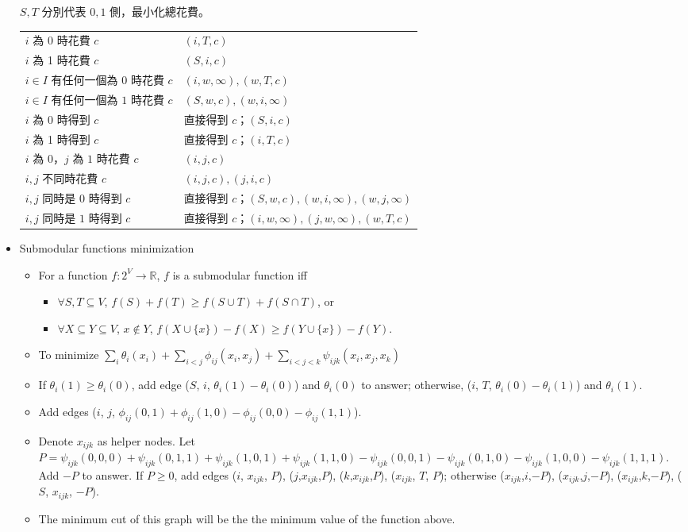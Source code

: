 \begin{itemize}
    $S, T$ 分別代表 $0, 1$ 側，最小化總花費。
    \begin{tabular}{|l|l|}
      $i$ 為 0 時花費 $c$ & $(i, T, c)$ \\
      $i$ 為 1 時花費 $c$ & $(S, i, c)$ \\
      $i \in I$ 有任何一個為 $0$ 時花費 $c$ & $(i, w, \infty), (w, T, c)$ \\
      $i \in I$ 有任何一個為 $1$ 時花費 $c$ & $(S, w, c), (w, i, \infty)$ \\
      $i$ 為 0 時得到 $c$ & 直接得到 $c$；$(S, i, c)$ \\
      $i$ 為 1 時得到 $c$ & 直接得到 $c$；$(i, T, c)$ \\
      $i$ 為 0，$j$ 為 $1$ 時花費 $c$ & $(i, j, c)$ \\
      $i, j$ 不同時花費 $c$ & $(i, j, c), (j, i, c)$ \\
      $i, j$ 同時是 $0$ 時得到 $c$ & 直接得到 $c$；$(S, w, c), (w, i, \infty), (w, j, \infty)$ \\
      $i, j$ 同時是 $1$ 時得到 $c$ & 直接得到 $c$；$(i, w, \infty), (j, w, \infty), (w, T, c)$ \\
    \end{tabular}
  \item Submodular functions minimization
    \begin{itemize}
      \item For a function $f: 2^V \to \mathbb{R}$, $f$ is a submodular function iff
        \begin{itemize}
          \item $\forall S,T \subseteq V$, $f(S) + f(T) \geq f(S \cup T) + f(S \cap T)$, or
          \item $\forall X \subseteq Y \subseteq V$, $x\notin Y$, $f(X\cup\{x\})-f(X)\geq f(Y\cup\{x\})-f(Y)$.
        \end{itemize}
      \item To minimize $\sum_i \theta_i (x_i) + \sum_{i< j} \phi_{ij} (x_i, x_j) + \sum_{i< j< k}  \psi_{ijk} (x_i, x_j, x_k)$
      \item If $\theta_i(1)\geq\theta_i(0)$, add edge ($S$, $i$, $\theta_i(1)-\theta_i(0)$) and $\theta_i(0)$ to answer; otherwise, ($i$, $T$, $\theta_i(0)-\theta_i(1)$) and $\theta_i(1)$.
      \item Add edges ($i$, $j$, $\phi_{ij}(0,1)+\phi_{ij}(1,0)-\phi_{ij}(0,0)-\phi_{ij}(1,1)$).
      \item Denote $x_{ijk}$ as helper nodes. Let $P=\psi_{ijk}(0,0,0)+\psi_{ijk}(0,1,1)+\psi_{ijk}(1,0,1)+\psi_{ijk}(1,1,0)-\psi_{ijk}(0,0,1)-\psi_{ijk}(0,1,0)-\psi_{ijk}(1,0,0)-\psi_{ijk}(1,1,1)$. Add $-P$ to answer. If $P \geq 0$, add edges ($i$, $x_{ijk}$, $P$), ($j$,$x_{ijk}$,$P$), ($k$,$x_{ijk}$,$P$), ($x_{ijk}$, $T$, $P$); otherwise ($x_{ijk}$,$i$,$-P$), ($x_{ijk}$,$j$,$-P$), ($x_{ijk}$,$k$,$-P$), ($S$, $x_{ijk}$, $-P$).
      \item The minimum cut of this graph will be the the minimum value of the function above.
    \end{itemize}
\end{itemize}
